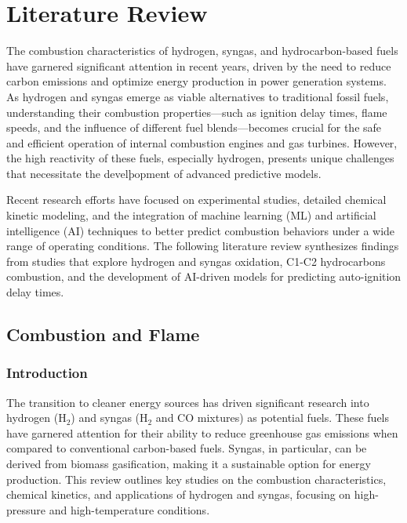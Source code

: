 \documentclass[12pt]{report}
\begin{document}
\newpage


\chapter{Literature Review}
The combustion characteristics of hydrogen, syngas, and hydrocarbon-based fuels have garnered significant attention in recent years, driven by the need to reduce carbon emissions and optimize energy production in power generation systems. As hydrogen and syngas emerge as viable alternatives to traditional fossil fuels, understanding their combustion properties—such as ignition delay times, flame speeds, and the influence of different fuel blends—becomes crucial for the safe and efficient operation of internal combustion engines and gas turbines. However, the high reactivity of these fuels, especially hydrogen, presents unique challenges that necessitate the develþopment of advanced predictive models.

Recent research efforts have focused on experimental studies, detailed chemical kinetic modeling, and the integration of machine learning (ML) and artificial intelligence (AI) techniques to better predict combustion behaviors under a wide range of operating conditions. The following literature review synthesizes findings from studies that explore hydrogen and syngas oxidation, C1-C2 hydrocarbons combustion, and the development of AI-driven models for predicting auto-ignition delay times.


\section{Combustion and Flame}

\subsection{Introduction}
The transition to cleaner energy sources has driven significant research into hydrogen (H$_2$) and syngas (H$_2$ and CO mixtures) as potential fuels. These fuels have garnered attention for their ability to reduce greenhouse gas emissions when compared to conventional carbon-based fuels. Syngas, in particular, can be derived from biomass gasification, making it a sustainable option for energy production. This review outlines key studies on the combustion characteristics, chemical kinetics, and applications of hydrogen and syngas, focusing on high-pressure and high-temperature conditions.
\end{document}
